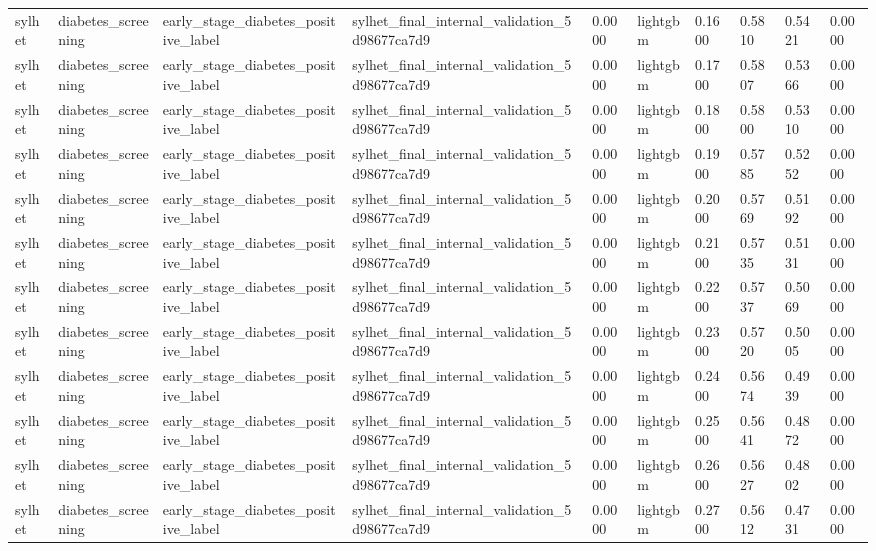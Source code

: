 \begin{tabular}{llllllllll}
sylhet & diabetes\_screening & early\_stage\_diabetes\_positive\_label & sylhet\_final\_internal\_validation\_5d98677ca7d9 & 0.0000 & lightgbm & 0.1600 & 0.5810 & 0.5421 & 0.0000 \\
sylhet & diabetes\_screening & early\_stage\_diabetes\_positive\_label & sylhet\_final\_internal\_validation\_5d98677ca7d9 & 0.0000 & lightgbm & 0.1700 & 0.5807 & 0.5366 & 0.0000 \\
sylhet & diabetes\_screening & early\_stage\_diabetes\_positive\_label & sylhet\_final\_internal\_validation\_5d98677ca7d9 & 0.0000 & lightgbm & 0.1800 & 0.5800 & 0.5310 & 0.0000 \\
sylhet & diabetes\_screening & early\_stage\_diabetes\_positive\_label & sylhet\_final\_internal\_validation\_5d98677ca7d9 & 0.0000 & lightgbm & 0.1900 & 0.5785 & 0.5252 & 0.0000 \\
sylhet & diabetes\_screening & early\_stage\_diabetes\_positive\_label & sylhet\_final\_internal\_validation\_5d98677ca7d9 & 0.0000 & lightgbm & 0.2000 & 0.5769 & 0.5192 & 0.0000 \\
sylhet & diabetes\_screening & early\_stage\_diabetes\_positive\_label & sylhet\_final\_internal\_validation\_5d98677ca7d9 & 0.0000 & lightgbm & 0.2100 & 0.5735 & 0.5131 & 0.0000 \\
sylhet & diabetes\_screening & early\_stage\_diabetes\_positive\_label & sylhet\_final\_internal\_validation\_5d98677ca7d9 & 0.0000 & lightgbm & 0.2200 & 0.5737 & 0.5069 & 0.0000 \\
sylhet & diabetes\_screening & early\_stage\_diabetes\_positive\_label & sylhet\_final\_internal\_validation\_5d98677ca7d9 & 0.0000 & lightgbm & 0.2300 & 0.5720 & 0.5005 & 0.0000 \\
sylhet & diabetes\_screening & early\_stage\_diabetes\_positive\_label & sylhet\_final\_internal\_validation\_5d98677ca7d9 & 0.0000 & lightgbm & 0.2400 & 0.5674 & 0.4939 & 0.0000 \\
sylhet & diabetes\_screening & early\_stage\_diabetes\_positive\_label & sylhet\_final\_internal\_validation\_5d98677ca7d9 & 0.0000 & lightgbm & 0.2500 & 0.5641 & 0.4872 & 0.0000 \\
sylhet & diabetes\_screening & early\_stage\_diabetes\_positive\_label & sylhet\_final\_internal\_validation\_5d98677ca7d9 & 0.0000 & lightgbm & 0.2600 & 0.5627 & 0.4802 & 0.0000 \\
sylhet & diabetes\_screening & early\_stage\_diabetes\_positive\_label & sylhet\_final\_internal\_validation\_5d98677ca7d9 & 0.0000 & lightgbm & 0.2700 & 0.5612 & 0.4731 & 0.0000 \\

\end{tabular}
